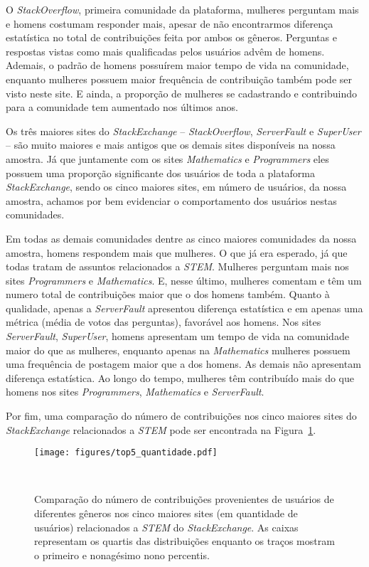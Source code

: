 O \emph{StackOverflow}, primeira comunidade da plataforma, mulheres perguntam mais e homens costumam responder mais, apesar de não encontrarmos diferença estatística no total de contribuições feita por ambos os gêneros. Perguntas e respostas vistas como mais qualificadas pelos usuários advêm de homens. Ademais, o padrão de homens possuírem maior tempo de vida na comunidade, enquanto mulheres possuem maior frequência de contribuição também pode ser visto neste site. E ainda, a proporção de mulheres se cadastrando e contribuindo para a comunidade tem aumentado nos últimos anos.

Os três maiores sites do \emph{StackExchange} -- \emph{StackOverflow}, \emph{ServerFault} e \emph{SuperUser} -- são muito maiores e mais antigos que os demais sites disponíveis na nossa amostra. Já que juntamente com os sites \emph{Mathematics} e \emph{Programmers} eles possuem uma proporção significante dos usuários de toda a plataforma \emph{StackExchange}, sendo os cinco maiores sites, em número de usuários, da nossa amostra, achamos por bem evidenciar o comportamento dos usuários nestas comunidades. 

Em todas as demais comunidades dentre as cinco maiores comunidades da nossa amostra, homens respondem mais que mulheres. O que já era esperado, já que todas tratam de assuntos relacionados a \emph{STEM}. Mulheres perguntam mais nos sites \emph{Programmers} e \emph{Mathematics}. E, nesse último, mulheres comentam e têm um numero total de contribuições maior que o dos homens também. Quanto à qualidade, apenas a \emph{ServerFault} apresentou diferença estatística e em apenas uma métrica (média de votos das perguntas), favorável aos homens. Nos sites \emph{ServerFault}, \emph{SuperUser}, homens apresentam um tempo de vida na comunidade maior do que as mulheres, enquanto apenas na \emph{Mathematics} mulheres possuem uma frequência de postagem maior que a dos homens. As demais não apresentam diferença estatística. Ao longo do tempo, mulheres têm contribuído mais do que homens nos sites \emph{Programmers}, \emph{Mathematics} e \emph{ServerFault}. 

Por fim, uma comparação do número de contribuições nos cinco maiores sites do \emph{StackExchange} relacionados a \emph{STEM} pode ser encontrada na Figura~\ref{fig:top-five}.


\begin{figure}[!b]
  \centering
  \texttt{[image: figures/top5\_quantidade.pdf]}
  \caption[Comparação do número de contribuições na 5 maiores comunidades.]{Comparação do número de contribuições provenientes de usuários de diferentes gêneros nos cinco maiores sites (em quantidade de usuários) relacionados a \emph{STEM} do \emph{StackExchange}. As caixas representam os quartis das distribuições enquanto os traços mostram o primeiro e nonagésimo nono percentis.}~\label{fig:top-five}
\end{figure}







